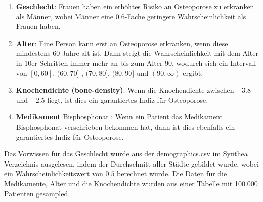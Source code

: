 \documentclass[german,version-2020-11]{uzl-thesis}
\begin{document}
\begin{enumerate}
	\item \textbf{Geschlecht}: Frauen haben ein erhöhtes Risiko an Osteoporose zu erkranken als Männer, wobei Männer eine $0.6$-Fache geringere Wahrscheinlichkeit als Frauen haben.
	\item \textbf{Alter}: Eine Person kann erst an Osteoporose erkranken, wenn diese mindestens 60 Jahre alt ist. Dann steigt die Wahrscheinlichkeit mit dem Alter in 10er Schritten immer mehr an bis zum Alter 90, wodurch sich ein Intervall von $[0,60]$, $(60,70]$ , $(70,80]$, $(80,90]$ und $(90,\infty)$ ergibt.
	\item \textbf{Knochendichte (bone-density)}: Wenn die Knochendichte zwischen $-3.8$ und $-2.5$ liegt, ist dies ein garantiertes Indiz für Osteoporose.
	\item \textbf{Medikament} Bisphosphonat : Wenn ein Patient das Medikament Bisphosphonat verschrieben bekommen hat, dann ist dies ebenfalls ein garantiertes Indiz für Osteoporose.
\end{enumerate} 
Das Vorwissen für das Geschlecht wurde aus der demographics.csv im Synthea Verzeichnis ausgelesen, indem der Durchschnitt aller Städte gebildet wurde, wobei ein Wahrscheinlichkeitswert von $0.5$ berechnet wurde. Die Daten für die Medikamente, Alter und die Knochendichte wurden aus einer Tabelle mit 100.000 Patienten gesampled. 
\end{document}
